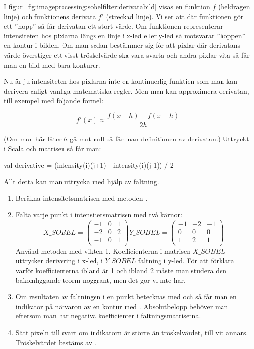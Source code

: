 I figur~\ref{fig:imageprocessing:sobelfilter:derivatabild} visas en funktion $f$ (heldragen linje) och funktionens derivata $f'$ (streckad linje). Vi ser att där funktionen gör ett ''hopp'' så får derivatan ett stort värde. Om funktionen representerar intensiteten hos pixlarna längs en linje i x-led eller y-led så motsvarar ''hoppen'' en kontur i bilden. Om man sedan bestämmer sig för att pixlar där derivatans värde överstiger ett visst tröskelvärde ska vara svarta och andra pixlar vita så får man en bild med bara konturer. 

Nu är ju intensiteten hos pixlarna inte en kontinuerlig funktion som man kan derivera enligt vanliga matematiska regler. Men man kan approximera derivatan, till exempel med följande formel:

\begin{displaymath}
f'(x) \approx \frac{f(x+h) - f(x-h)}{2h}
\end{displaymath}

(Om man här låter $h$ gå mot noll så får man definitionen av derivatan.) Uttryckt i Scala och matrisen  så får man:

\begin{Code}
val derivative = (intensity(i)(j+1) - intensity(i)(j-1)) / 2
\end{Code}

Allt detta kan man uttrycka med hjälp av faltning. 

\begin{enumerate} 
	\item Beräkna intensitetsmatrisen med metoden .
	\item Falta varje punkt i intensitetsmatrisen med två kärnor:
$$
X\_SOBEL =
\begin{pmatrix}
  -1 & 0 & 1 \\
  -2 & 0 & 2 \\
  -1 & 0 & 1 \\
\end{pmatrix}
Y\_SOBEL =
\begin{pmatrix}
  -1 & -2 & -1 \\
  0 & 0 & 0 \\
  1 & 2 & 1 \\
\end{pmatrix}
$$
	Använd metoden  med vikten 1. Koefficienterna i matrisen $X\_SOBEL$ uttrycker derivering i x-led, i $Y\_SOBEL$ faltning i y-led. För att förklara varför koefficienterna ibland är 1 och ibland 2 måste man studera den bakomliggande teorin noggrant, men det gör vi inte här.
	\item Om resultaten av faltningen i en punkt betecknas med  och  så får man en indikator på närvaron av en kontur med . Absolutbelopp behöver man eftersom man har negativa koefficienter i faltningsmatriserna. 
	\item  Sätt pixeln till svart om indikatorn är större än tröskelvärdet, till vit annars. Tröskelvärdet bestäms av . 
\end{enumerate}


